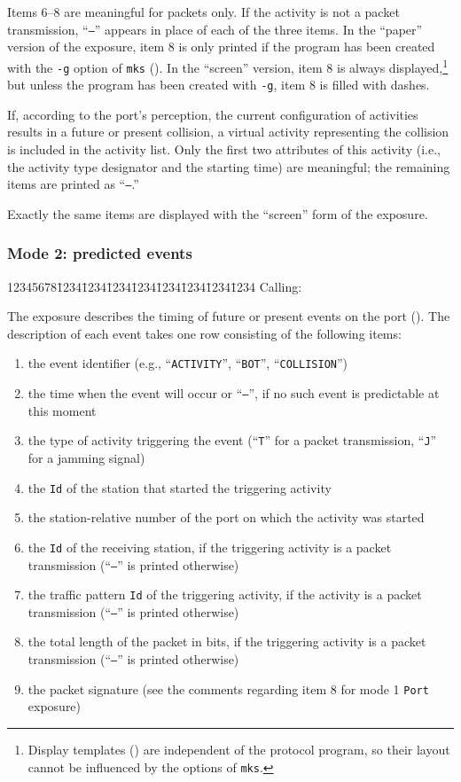 Items 6--8 are meaningful for packets only.
If the activity is not a packet transmission, ``{\tt ---}''
appears in place of each of the three items.
In the ``paper'' version of the exposure, item 8 is only printed if the
program has been created with the {\tt -g} option of {\tt mks}
().
In the ``screen'' version, item 8 is always
displayed,\footnote{Display templates ()
are independent of the protocol program, so their
layout cannot be influenced by the options of {\tt mks}.}
but unless the program has been created with {\tt -g}, item 8 is filled
with dashes.

If, according to the port's perception, the current configuration of activities
results in a future or present collision, a virtual activity representing
the collision is included in the activity list.
Only the first two attributes of this activity (i.e., the activity type
designator and the starting time) are meaningful; the remaining items are
printed as ``{\tt ---}.''

Exactly the same items are displayed with the ``screen''
form of the exposure.

\subsubsection*{Mode 2: predicted events}

{\tt\begin{tabbing}
12345678\=1234\=1234\=1234\=1234\=1234\=1234\=1234\=1234\kill
{\rm Calling:}
\end{tabbing}}

The exposure describes the timing of future or present events on the port
().
The description of each event takes one row consisting of the following
items:

\begin{enumerate}
\item
the event identifier (e.g., ``{\tt ACTIVITY}'', ``{\tt BOT}'',
``{\tt COLLISION}'')
\item
the time when the event will occur or ``{\tt ---}'', if no such event is
predictable at this moment
\item
the type of activity triggering the event (``{\tt T}'' for a packet
transmission, ``{\tt J}'' for a jamming signal)
\item
the {\tt Id} of the station that started the triggering activity
\item
the station-relative number of the port on which the activity was started
\item
the {\tt Id} of the receiving station, if the triggering activity is a
packet transmission (``{\tt ---}'' is printed otherwise)
\item
the traffic pattern {\tt Id} of the triggering activity,
if the activity is a
packet transmission (``{\tt ---}'' is printed otherwise)
\item
the total length of the packet in bits,
if the triggering activity is a
packet transmission (``{\tt ---}'' is printed otherwise)
\item
the packet signature (see the comments regarding item 8 for mode 1
{\tt Port} exposure)
\end{enumerate}

